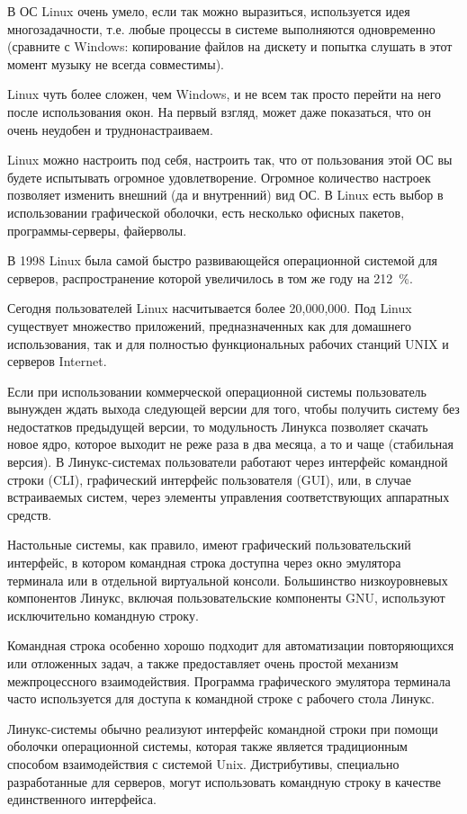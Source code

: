 В ОС Linux очень умело, если так можно выразиться, используется идея многозадачности, т.е. любые процессы в системе выполняются одновременно (сравните с Windows: копирование файлов на дискету и попытка слушать в этот момент музыку не всегда совместимы).

Linux чуть более сложен, чем Windows, и не всем так просто перейти на него после использования окон. На первый взгляд, может даже показаться, что он очень неудобен и труднонастраиваем.

Linux можно настроить под себя, настроить так, что от пользования этой ОС вы будете испытывать огромное удовлетворение. Огромное количество настроек позволяет изменить внешний (да и внутренний) вид ОС. В Linux есть выбор в использовании графической оболочки, есть несколько офисных пакетов, программы-серверы, файерволы.

В 1998 Linux была самой быстро развивающейся операционной системой для серверов, распространение которой увеличилось в том же году на 212~\%.

Сегодня пользователей Linux насчитывается более 20,000,000. Под Linux существует множество приложений, предназначенных как для домашнего использования, так и для полностью функциональных рабочих станций UNIX и серверов Internet.

Если при использовании коммерческой операционной системы пользователь вынужден ждать выхода следующей версии для того, чтобы получить систему без недостатков предыдущей версии, то модульность Линукса позволяет скачать новое ядро, которое выходит не реже раза в два месяца, а то и чаще (стабильная версия). В Линукс-системах пользователи работают через интерфейс командной строки (CLI), графический интерфейс пользователя (GUI), или, в случае встраиваемых систем, через элементы управления соответствующих аппаратных средств.

Настольные системы, как правило, имеют графический пользовательский интерфейс, в котором командная строка доступна через окно эмулятора терминала или в отдельной виртуальной консоли. Большинство низкоуровневых компонентов Линукс, включая пользовательские компоненты GNU, используют исключительно командную строку.

Командная строка особенно хорошо подходит для автоматизации повторяющихся или отложенных задач, а также предоставляет очень простой механизм межпроцессного взаимодействия. Программа графического эмулятора терминала часто используется для доступа к командной строке с рабочего стола Линукс.

Линукс-системы обычно реализуют интерфейс командной строки при помощи оболочки операционной системы, которая также является традиционным способом взаимодействия с системой Unix. Дистрибутивы, специально разработанные для серверов, могут использовать командную строку в качестве единственного интерфейса.

